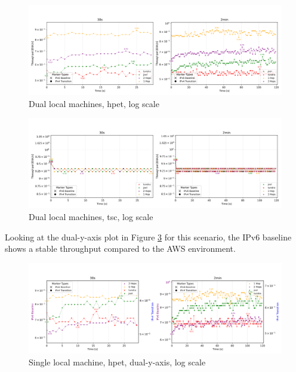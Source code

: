 \begin{figure}[H]
    \centering
    \includegraphics[width=1\textwidth]{resources/plots/CombinedPlot/TCP/Double_tcp_sameScale_hpet_log.png}
    \caption{Dual local machines, hpet, log scale}
    \label{fig:Dual_tcp_sameScale_hpet_log}
\end{figure}

\begin{figure}[H]
    \centering
    \includegraphics[width=1\textwidth]{resources/plots/CombinedPlot/TCP/Double_tcp_sameScale_tsc_log.png}
    \caption{Dual local machines, tsc, log scale}
    \label{fig:Dual_tcp_sameScale_tsc_log}
\end{figure}

Looking at the dual-y-axis plot in Figure \ref{fig:Double_tcp_dualAxis_hpet_log} for this scenario, the IPv6 baseline shows a stable throughput compared to the AWS environment.
\begin{figure}[H]
    \centering
    \includegraphics[width=1\textwidth]{resources/plots/JitterPlot/Double_tcp_dualAxis_hpet_log.png}
    \caption{Single local machine, hpet, dual-y-axis, log scale}
    \label{fig:Double_tcp_dualAxis_hpet_log}
\end{figure}

